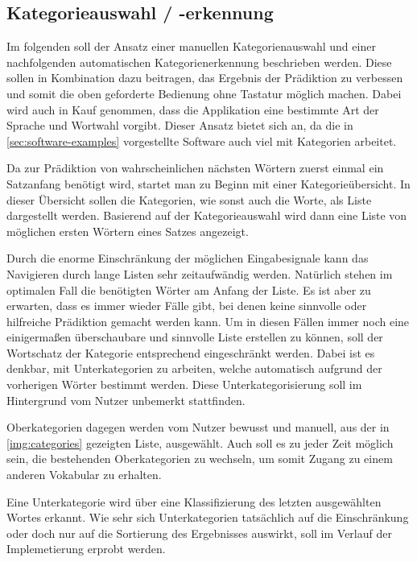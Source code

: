         
    \newpage
	\subsection{Kategorieauswahl / -erkennung}
    \label{sec:requirements_categories}
    
    	Im folgenden soll der Ansatz einer manuellen Kategorienauswahl und einer nachfolgenden automatischen Kategorienerkennung beschrieben werden. Diese sollen in Kombination dazu beitragen, das Ergebnis der Prädiktion zu verbessen und somit die oben geforderte Bedienung ohne Tastatur möglich machen. Dabei wird auch in Kauf genommen, dass die Applikation eine bestimmte Art der Sprache und Wortwahl vorgibt. Dieser Ansatz bietet sich an, da die in \autoref{sec:software-examples} vorgestellte Software auch viel mit Kategorien arbeitet.
        
    	Da zur Prädiktion von wahrscheinlichen nächsten Wörtern zuerst einmal ein Satzanfang benötigt wird, startet man zu Beginn mit einer Kategorieübersicht. In dieser Übersicht sollen die Kategorien, wie sonst auch die Worte, als Liste dargestellt werden. Basierend auf der Kategorieauswahl wird dann eine Liste von möglichen ersten Wörtern eines Satzes angezeigt. 
        
        Durch die enorme Einschränkung der möglichen Eingabesignale kann das Navigieren durch lange Listen sehr zeitaufwändig werden. Natürlich stehen im optimalen Fall die benötigten Wörter am Anfang der Liste. Es ist aber zu erwarten, dass es immer wieder Fälle gibt, bei denen keine sinnvolle oder hilfreiche Prädiktion gemacht werden kann. Um in diesen Fällen immer noch eine einigermaßen überschaubare und sinnvolle Liste erstellen zu können, soll der Wortschatz der Kategorie entsprechend eingeschränkt werden. Dabei ist es denkbar, mit Unterkategorien zu arbeiten, welche automatisch aufgrund der vorherigen Wörter bestimmt werden. Diese Unterkategorisierung soll im Hintergrund vom Nutzer unbemerkt stattfinden. 
        
        Oberkategorien dagegen werden vom Nutzer bewusst und manuell, aus der in \autoref{img:categories} gezeigten Liste, ausgewählt. Auch soll es zu jeder Zeit möglich sein, die bestehenden Oberkategorien zu wechseln, um somit Zugang zu einem anderen Vokabular zu erhalten.
        
        Eine Unterkategorie wird über eine Klassifizierung des letzten ausgewählten Wortes erkannt. Wie sehr sich Unterkategorien tatsächlich auf die Einschränkung oder doch nur auf die Sortierung des Ergebnisses auswirkt, soll im Verlauf der Implemetierung erprobt werden.
        
